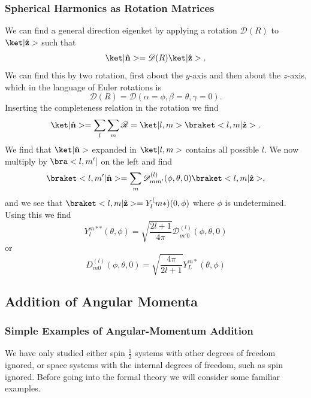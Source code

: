 \subsubsection{Spherical Harmonics as Rotation Matrices}
We can find a general direction eigenket by applying a rotation $\mathscr{D}(R)$ to $\k{\hat{\vec{z}}}$ such that
\begin{equation}
    \k{\hat{\vec{n}}} = \mathscr{D}(R)\k{\hat{\vec{z}}}.
\end{equation}
We can find this by two rotation, first about the $y$-axis and then about the $z$-axis, which in the language of Euler rotations is
\begin{equation}
    \mathscr{D}(R) = \mathscr{D}(\alpha = \phi, \beta=\theta, \gamma = 0).
\end{equation}
Inserting the completeness relation in the rotation we find
\begin{equation}
    \k{\hat{\vec{n}}} = \sum_l \sum_m \mathscr{R} = \k{l,m}\bk{l,m}{\hat{\vec{z}}}.
\end{equation}
We find that $\k{\hat{\vec{n}}}$ expanded in $\k{l,m}$ contains all possible $l$. We now multiply by $\b{l,m'}$ on the left and find
\begin{align}
    \bk{l,m'}{\hat{\vec{n}}} = \sum_m \mathscr{D}_{mm'}^{(l)} (\phi,\theta, 0)\bk{l,m}{\hat{\vec{z}}},
\end{align}
and we see that $\bk{l,m}{\hat{\vec{z}}} = Y_l^(m*)(0,\phi)$ where $\phi$ is undetermined. Using this we find
\begin{equation}
    Y_l^{m**}(\theta,\phi) = \sqrt{\frac{2l+1}{4\pi}} \mathscr{D}_{m'0}^{(l)}(\phi,\theta,0)
\end{equation}
or
\begin{equation}
    D_{m0}^{(l)}(\phi,\theta,0) = \sqrt{\frac{4\pi}{2l+1}} Y_L^{m*}(\theta, \phi)
\end{equation}


\subsection{Addition of Angular Momenta}

\subsubsection{Simple Examples of Angular-Momentum Addition}
We have only studied either spin $\frac{1}{2}$ systems with other degrees of freedom ignored, or space systems with the internal degrees of freedom, such as spin ignored. Before going into the formal theory we will consider some familiar examples.

